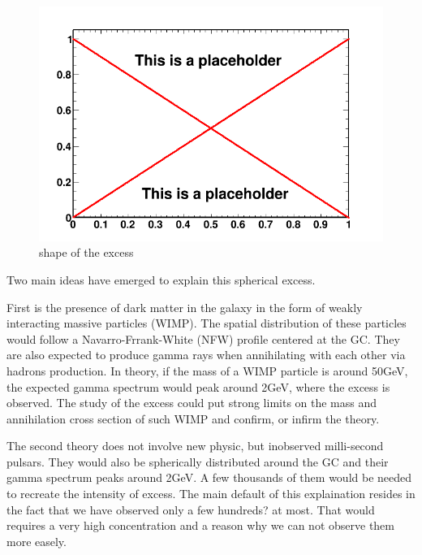 \begin{figure}
 \centering
 \includegraphics[width=.9\linewidth]{pic/dummy.png}
 \caption{shape of the excess}
 \label{fig:first_BKGonly_fits}
\end{figure}


Two main ideas have emerged to explain this spherical excess.

First is the presence of dark matter in the galaxy in the form of weakly interacting massive particles (WIMP). The spatial distribution of these particles would follow a Navarro-Frrank-White (NFW) profile centered at the GC. They are also expected to produce gamma rays when annihilating with each other via hadrons production. In theory, if the mass of a WIMP particle is around 50GeV, the expected gamma spectrum would peak around 2GeV, where the excess is observed. 
The study of the excess could put strong limits on the mass and annihilation cross section of such WIMP and confirm, or infirm the theory.

The second theory does not involve new physic, but inobserved milli-second pulsars. They would also be spherically distributed around the GC and their gamma spectrum peaks around 2GeV. A few thousands of them would be needed to recreate the intensity of excess. The main default of this explaination resides in the fact that we have observed only a few hundreds? at most. That would requires a very high concentration and a reason why we can not observe them more easely.







































